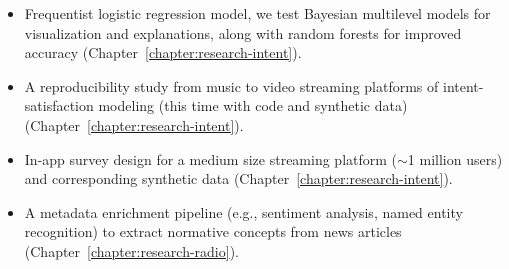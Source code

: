 \begin{itemize}
\item Frequentist logistic regression model, we test Bayesian multilevel models for visualization and explanations, along with random forests for improved accuracy (Chapter~\ref{chapter:research-intent}).
\item A reproducibility study from music to video streaming platforms of intent-satisfaction modeling (this time with code and synthetic data) (Chapter~\ref{chapter:research-intent}).
\item In-app survey design for a medium size streaming platform ($\sim$1 million users) and corresponding synthetic data (Chapter~\ref{chapter:research-intent}).
\item A metadata enrichment pipeline (e.g., sentiment analysis, named entity recognition) to extract normative concepts from news articles (Chapter~\ref{chapter:research-radio}).
\end{itemize}
